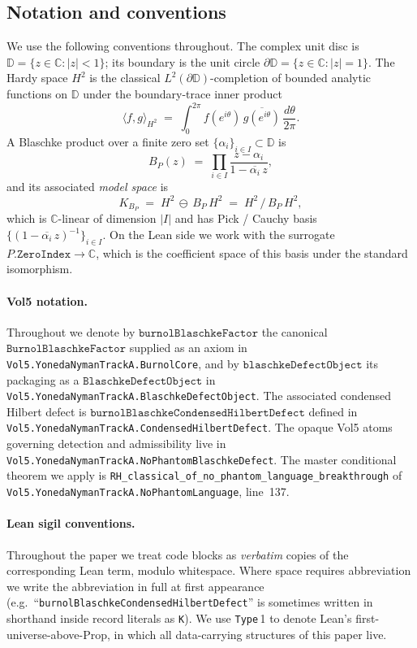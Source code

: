 \documentclass[11pt]{article}
\theoremstyle{plain}
\theoremstyle{definition}
\theoremstyle{remark}
\newcommand{\HtH}{H^{2}}
\newcommand{\C}{\mathbb{C}}
\newcommand{\D}{\mathbb{D}}
\newcommand{\code}[1]{\texttt{#1}}
\begin{document}
\subsection{Notation and conventions}

We use the following conventions throughout. The complex unit disc is
\(\D = \{z \in \C : |z| < 1\}\); its boundary is the unit circle
\(\partial \D = \{z \in \C : |z| = 1\}\). The Hardy space \(\HtH\) is the
classical \(L^{2}(\partial \D)\)-completion of bounded analytic functions
on \(\D\) under the boundary-trace inner product
\[
  \langle f, g \rangle_{\HtH}
    \;=\; \int_{0}^{2\pi}
      f(e^{i\theta})\,\overline{g(e^{i\theta})}\,
      \frac{d\theta}{2\pi}.
\]
A Blaschke product over a finite zero set
\(\{\alpha_{i}\}_{i \in I} \subset \D\) is
\[
  B_{P}(z) \;=\; \prod_{i \in I}
    \frac{z - \alpha_{i}}{1 - \overline{\alpha_{i}}\,z},
\]
and its associated \emph{model space} is
\[
  K_{B_{P}} \;=\; \HtH \,\ominus\, B_{P}\,\HtH
   \;=\; \HtH \,/\, B_{P}\,\HtH,
\]
which is \(\C\)-linear of dimension \(|I|\) and has Pick / Cauchy basis
\(\{(1 - \overline{\alpha_{i}}\,z)^{-1}\}_{i \in I}\).
On the Lean side we work with the surrogate
\(P.\code{ZeroIndex} \to \C\), which is the coefficient space of this
basis under the standard isomorphism.

\paragraph{Vol5 notation.}
Throughout we denote by \(\code{burnolBlaschkeFactor}\) the
canonical \(\code{BurnolBlaschkeFactor}\) supplied as an axiom in
\code{Vol5.YonedaNymanTrackA.BurnolCore}, and by
\(\code{blaschkeDefectObject}\) its packaging as a
\(\code{BlaschkeDefectObject}\) in
\code{Vol5.YonedaNymanTrackA.BlaschkeDefectObject}.  The associated
condensed Hilbert defect is
\(\code{burnolBlaschkeCondensedHilbertDefect}\) defined in
\code{Vol5.YonedaNymanTrackA.CondensedHilbertDefect}.  The opaque
Vol5 atoms governing detection and admissibility live in
\code{Vol5.YonedaNymanTrackA.NoPhantomBlaschkeDefect}.  The
master conditional theorem we apply is
\code{RH\_classical\_of\_no\_phantom\_language\_breakthrough} of
\code{Vol5.YonedaNymanTrackA.NoPhantomLanguage}, line~137.

\paragraph{Lean sigil conventions.}
Throughout the paper we treat code blocks as \emph{verbatim} copies of
the corresponding Lean term, modulo whitespace.  Where space requires
abbreviation we write the abbreviation in full at first appearance
(e.g.\ ``\code{burnolBlaschkeCondensedHilbertDefect}'' is sometimes
written in shorthand inside record literals as \code{K}).  We use
\code{Type}\,1 to denote Lean's first-universe-above-Prop, in which all
data-carrying structures of this paper live.
\end{document}
